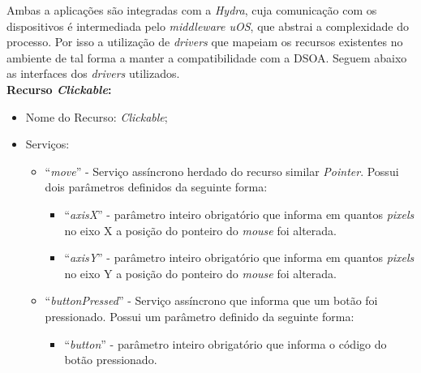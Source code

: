 Ambas a aplicações são integradas com a \emph{Hydra}, cuja comunicação com os dispositivos é intermediada pelo \emph{middleware uOS}, que abstrai a complexidade do processo. Por isso a utilização de \emph{drivers} que mapeiam os recursos existentes no ambiente de tal forma a manter a compatibilidade com a DSOA. Seguem abaixo as interfaces dos \emph{drivers} utilizados. \\

\textbf{Recurso \emph{Clickable}:}

\begin{itemize}
	
	\item Nome do Recurso: \emph{Clickable};

	\item Serviços:
		
		\begin{itemize}

			\item ``\emph{move}'' - Serviço assíncrono herdado do recurso similar \emph{Pointer}. Possui dois parâmetros definidos da seguinte forma:

				\begin{itemize}
					\item ``\emph{axisX}'' - parâmetro inteiro obrigatório que informa em quantos \emph{pixels} no eixo X a posição do ponteiro do \emph{mouse} foi alterada.

					\item ``\emph{axisY}'' - parâmetro inteiro obrigatório que informa em quantos \emph{pixels} no eixo Y a posição do ponteiro do \emph{mouse} foi alterada.
				\end{itemize}
			
			\item ``\emph{buttonPressed}'' - Serviço assíncrono que informa que um botão foi pressionado. Possui um parâmetro definido da seguinte forma:

				\begin{itemize}
					\item ``\emph{button}'' - parâmetro inteiro obrigatório que informa o código do botão pressionado.
				\end{itemize}
			

\end{itemize}
\end{itemize}
